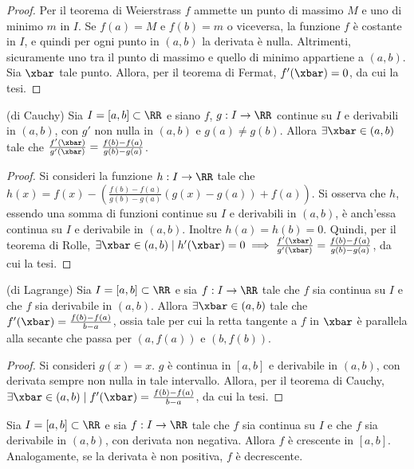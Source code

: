 \documentclass[11pt]{article}
\begin{document}
	\begin{proof}
		Per il teorema di Weierstrass $f$ ammette un punto di massimo $M$ e uno di minimo $m$ in $I$. Se $f(a) = M$ e $f(b) = m$ o viceversa, la
		funzione $f$ è costante in $I$, e quindi per ogni punto in $(a, b)$
		la derivata è nulla. Altrimenti,
		sicuramente uno tra il punto di massimo e quello di minimo appartiene
		a $(a, b)$. Sia $\xbar$ tale punto. Allora, per il teorema di Fermat, $f'(\xbar) = 0$, da cui
		la tesi.
	\end{proof}

	\begin{theorem} (di Cauchy)
		Sia $I = [a, b] \subset \RR$ e siano $f$, $g: I \to \RR$
		continue su $I$ e derivabili in $(a, b)$, con $g'$ non nulla
		in $(a, b)$ e $g(a) \neq g(b)$. Allora
		$\exists \xbar \in (a, b)$ tale che $\frac{f'(\xbar)}{g'(\xbar)} = \frac{f(b) - f(a)}{g(b)-g(a)}$.
	\end{theorem}

	\begin{proof}
		Si consideri la funzione $h : I \to \RR$ tale che $h(x) = f(x) - \left(\frac{f(b) - f(a)}{g(b) - g(a)} (g(x) - g(a)) + f(a)\right)$.
		Si osserva che $h$,
		essendo una somma di funzioni continue su $I$ e derivabili in $(a, b)$,
		è anch'essa continua su $I$ e derivabile in $(a, b)$. Inoltre
		$h(a) = h(b) = 0$. Quindi, per il teorema di Rolle, $\exists \xbar \in (a, b) \mid h'(\xbar) = 0 \implies \frac{f'(\xbar)}{g'(\xbar)} = \frac{f(b)-f(a)}{g(b)-g(a)}$,
		da cui la tesi.
	\end{proof}

	\begin{theorem} (di Lagrange)
		Sia $I = [a, b] \subset \RR$ e sia $f: I \to \RR$ tale che $f$
		sia continua su $I$ e che $f$ sia derivabile in $(a, b)$. Allora
		$\exists \xbar \in (a, b)$ tale che $f'(\xbar) = \frac{f(b) - f(a)}{b-a}$, ossia tale per cui la retta tangente a $f$ in $\xbar$ è parallela alla secante
		che passa per $(a, f(a))$ e $(b, f(b))$.
	\end{theorem}

	\begin{proof}
		Si consideri $g(x) = x$. $g$ è continua in $[a, b]$ e derivabile
		in $(a, b)$, con derivata sempre non nulla in tale intervallo.
		Allora, per il teorema di Cauchy, $\exists \xbar \in (a, b) \mid
		f'(\xbar) = \frac{f(b)-f(a)}{b-a}$, da cui la tesi.
	\end{proof}

	\begin{proposition}
		Sia $I = [a, b] \subset \RR$ e sia $f : I \to \RR$ tale che $f$
		sia continua su $I$ e che $f$ sia derivabile in $(a, b)$, con
		derivata non negativa. Allora $f$ è crescente in $[a, b]$.
		Analogamente, se la derivata è non positiva, $f$ è decrescente.
	\end{proposition}
\end{document}
